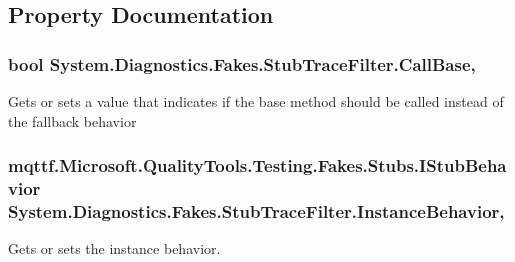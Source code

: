 \subsection{Property Documentation}
\hypertarget{class_system_1_1_diagnostics_1_1_fakes_1_1_stub_trace_filter_a7873c384403acec63d7bfc6205cce3ab}{
\subsubsection[{Call\-Base}]{\setlength{\rightskip}{0pt plus 5cm}bool System.\-Diagnostics.\-Fakes.\-Stub\-Trace\-Filter.\-Call\-Base\hspace{0.3cm}{\ttfamily [get]}, {\ttfamily [set]}}}\label{class_system_1_1_diagnostics_1_1_fakes_1_1_stub_trace_filter_a7873c384403acec63d7bfc6205cce3ab}


Gets or sets a value that indicates if the base method should be called instead of the fallback behavior

\hypertarget{class_system_1_1_diagnostics_1_1_fakes_1_1_stub_trace_filter_a0d4e3d8d7d76b4cba6f5fcb1ef5dc867}{
\subsubsection[{Instance\-Behavior}]{\setlength{\rightskip}{0pt plus 5cm}mqttf.\-Microsoft.\-Quality\-Tools.\-Testing.\-Fakes.\-Stubs.\-I\-Stub\-Behavior System.\-Diagnostics.\-Fakes.\-Stub\-Trace\-Filter.\-Instance\-Behavior\hspace{0.3cm}{\ttfamily [get]}, {\ttfamily [set]}}}\label{class_system_1_1_diagnostics_1_1_fakes_1_1_stub_trace_filter_a0d4e3d8d7d76b4cba6f5fcb1ef5dc867}


Gets or sets the instance behavior.

